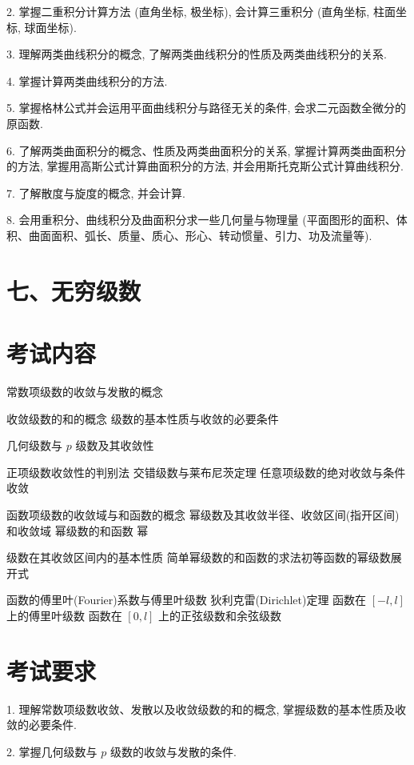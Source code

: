 \documentclass[10pt]{article}
\begin{document}
2. 掌握二重积分计算方法 (直角坐标, 极坐标), 会计算三重积分 (直角坐标, 柱面坐标, 球面坐标).

3. 理解两类曲线积分的概念, 了解两类曲线积分的性质及两类曲线积分的关系.

4. 掌握计算两类曲线积分的方法.

5. 掌握格林公式并会运用平面曲线积分与路径无关的条件, 会求二元函数全微分的原函数.

6. 了解两类曲面积分的概念、性质及两类曲面积分的关系, 掌握计算两类曲面积分的方法, 掌握用高斯公式计算曲面积分的方法, 并会用斯托克斯公式计算曲线积分.

7. 了解散度与旋度的概念, 并会计算.

8. 会用重积分、曲线积分及曲面积分求一些几何量与物理量 (平面图形的面积、体积、曲面面积、弧长、质量、质心、形心、转动惯量、引力、功及流量等).

\section*{七、无穷级数}

\section*{考试内容}

常数项级数的收敛与发散的概念 

收敛级数的和的概念 级数的基本性质与收敛的必要条件 

几何级数与 \(p\) 级数及其收敛性 

正项级数收敛性的判别法 交错级数与莱布尼茨定理 任意项级数的绝对收敛与条件收敛 

函数项级数的收敛域与和函数的概念 幂级数及其收敛半径、收敛区间(指开区间)和收敛域 幂级数的和函数 幂

级数在其收敛区间内的基本性质 简单幂级数的和函数的求法初等函数的幂级数展开式 

函数的傅里叶(Fourier)系数与傅里叶级数 狄利克雷(Dirichlet)定理 函数在 \(\left\lbrack  {-l,l}\right\rbrack\) 上的傅里叶级数 函数在 \(\left\lbrack  {0,l}\right\rbrack\) 上的正弦级数和余弦级数

\section*{考试要求}

1. 理解常数项级数收敛、发散以及收敛级数的和的概念, 掌握级数的基本性质及收敛的必要条件.

2. 掌握几何级数与 \(p\) 级数的收敛与发散的条件.
\end{document}
